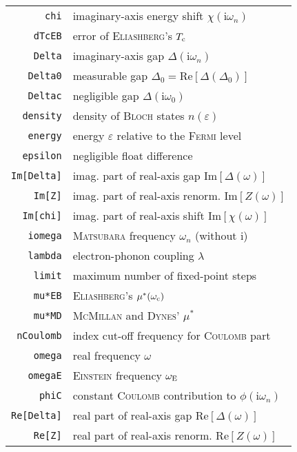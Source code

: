 \documentclass[twocolumn]{article}
\def\I{\mathrm i}
\def\sub#1{\sb{\mathrm{#1}}}
\let\epsilon\varepsilon
\let\Delta\varDelta
\def\Re{\mathrm{Re}}
\def\Im{\mathrm{Im}}
\newlength\gap
\let\name\textsc
\begin{document}
   \begin{table}[b]
      \centering
      \begin{tabular}{r l}
         \verb|chi| & imaginary-axis energy shift $\chi(\I \omega_n)$ \\
         \verb|dTcEB| & error of \name{Eliashberg}'s $T \sub c$ \\
         \verb|Delta| & imaginary-axis gap $\Delta(\I \omega_n)$ \\
         \verb|Delta0| & measurable gap $\Delta_0 = \Re[\Delta(\Delta_0)]$ \\
         \verb|Deltac| & negligible gap $\Delta(\I \omega_0)$ \\
         \verb|density| & density of \name{Bloch} states $n(\epsilon)$ \\
         \verb|energy| & energy $\epsilon$ relative to the \name{Fermi} level \\
         \verb|epsilon| & negligible float difference \\
         \verb|Im[Delta]| & imag. part of real-axis gap $\Im[\Delta(\omega)]$ \\
         \verb|Im[Z]| & imag. part of real-axis renorm. $\Im[Z(\omega)]$ \\
         \verb|Im[chi]| & imag. part of real-axis shift $\Im[\chi(\omega)]$ \\
         \verb|iomega| & \name{Matsubara} frequency $\omega_n$ (without $\I$) \\
         \verb|lambda| & electron-phonon coupling $\lambda$ \\
         \verb|limit| & maximum number of fixed-point steps \\
         \verb|mu*EB| & \name{Eliashberg}'s $\mu^*(\omega \sub c)$ \\
         \verb|mu*MD| & \name{McMillan} and \name{Dynes}' $\mu^*$ \\
         \verb|nCoulomb| & index cut-off frequency for \name{Coulomb} part \\
         \verb|omega| & real frequency $\omega$ \\
         \verb|omegaE| & \name{Einstein} frequency $\omega \sub E$ \\
         \verb|phiC|
            & constant \name{Coulomb} contribution to $\phi(\I \omega_n)$ \\
         \verb|Re[Delta]| & real part of real-axis gap $\Re[\Delta(\omega)]$ \\
         \verb|Re[Z]| & real part of real-axis renorm. $\Re[Z(\omega)]$ \\

\end{tabular}
\end{table}
\end{document}
